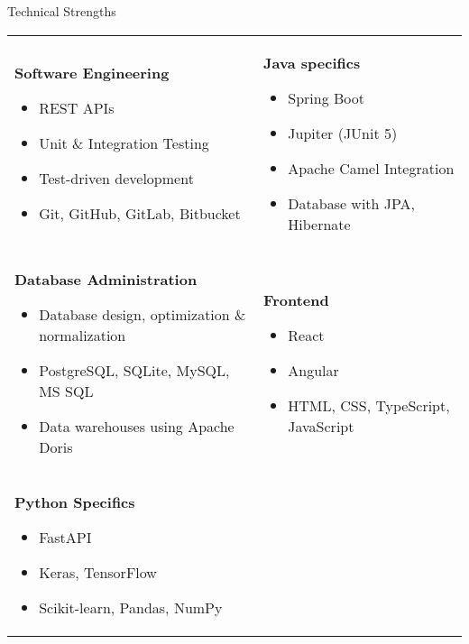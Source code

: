 \begin{rSection}{Technical Strengths}
    \begin{tabular}{p{} p{}}
        \textbf{Software Engineering}
        \begin{itemize}
            \item REST APIs
            \item Unit \& Integration Testing
            \item Test-driven development
            \item Git, GitHub, GitLab, Bitbucket
        \end{itemize}
         &
        \textbf{Java specifics}
        \begin{itemize}
            \item Spring Boot
            \item Jupiter (JUnit 5)
            \item Apache Camel Integration
            \item Database with JPA, Hibernate
        \end{itemize}
        \\
        \vspace{0.5em}
        \textbf{Database Administration}
        \begin{itemize}
            \item Database design, optimization \& normalization
            \item PostgreSQL, SQLite, MySQL, MS SQL
            \item Data warehouses using Apache Doris
        \end{itemize}
         &
        \vspace{0.5em}
        \textbf{Frontend}
        \begin{itemize}
            \item React
            \item Angular
            \item HTML, CSS, TypeScript, JavaScript
        \end{itemize}
        \\
        \vspace{0.5em}
        \textbf{Python Specifics}
        \begin{itemize}
            \item FastAPI
            \item Keras, TensorFlow
            \item Scikit-learn, Pandas, NumPy

\end{itemize}
\end{tabular}
\end{rSection}
